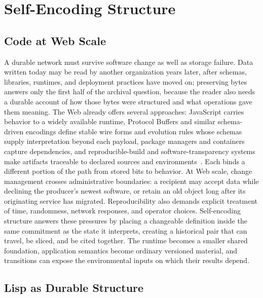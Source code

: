 \section{Self-Encoding Structure}
\label{sec:self-encoding}
\label{sec:objects}
\label{sec:sandbox}
\label{sec:semantic-bootstrapping}

\subsection{Code at Web Scale}

A durable network must survive software change as well as storage failure. Data written today may be read by another organization years later, after schemas, libraries, runtimes, and deployment practices have moved on; preserving bytes answers only the first half of the archival question, because the reader also needs a durable account of how those bytes were structured and what operations gave them meaning. The Web already offers several approaches: JavaScript carries behavior to a widely available runtime, Protocol Buffers and similar schema-driven encodings define stable wire forms and evolution rules whose schemas supply interpretation beyond each payload, package managers and containers capture dependencies, and reproducible-build and software-transparency systems make artifacts traceable to declared sources and environments~\cite{Nikitin2017chainiac}. Each binds a different portion of the path from stored bits to behavior. At Web scale, change management crosses administrative boundaries: a recipient may accept data while declining the producer's newest software, or retain an old object long after its originating service has migrated. Reproducibility also demands explicit treatment of time, randomness, network responses, and operator choices. Self-encoding structure answers these pressures by placing a changeable definition inside the same commitment as the state it interprets, creating a historical pair that can travel, be sliced, and be cited together. The runtime becomes a smaller shared foundation, application semantics become ordinary versioned material, and transitions can expose the environmental inputs on which their results depend.

\subsection{Lisp as Durable Structure}

